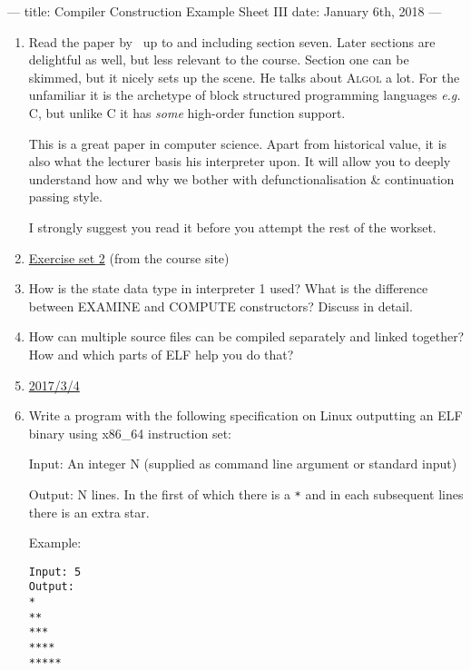 ---
title: Compiler Construction Example Sheet III
date: January 6th, 2018
---



\begin{enumerate}
  \item Read the paper by~\citet{reynolds1972definitional} up to and including
    section seven. Later sections are delightful as well, but less relevant to
    the course. Section one can be skimmed, but it nicely sets up the scene. He
    talks about \textsc{Algol} a lot. For the unfamiliar it is the archetype of
    block structured programming languages \emph{e.g.} \textsc{C}, but unlike
    \textsc{C} it has \emph{some} high-order function support.

    This is a great paper in computer science. Apart from historical value, it
    is also what the lecturer basis his interpreter upon. It will allow you to
    deeply understand how and why we bother with defunctionalisation \&
    continuation passing style.

    I strongly suggest you read it before you attempt the rest of the workset.

  \item
    \href{https://www.cl.cam.ac.uk/teaching/current/CompConstr/Exercises_Set_2.ml}{Exercise
    set 2} (from the course site)

  \item How is the state data type in interpreter 1 used? What is the
    difference between EXAMINE and COMPUTE constructors? Discuss in detail.

  \item How can multiple source files can be compiled separately and linked
    together? How and which parts of ELF help you do that?

  \item \href{http://www.cl.cam.ac.uk/teaching/exams/pastpapers/y2017p23q4.pdf}{2017/3/4}

  \item Write a program with the following specification on Linux outputting an
    ELF binary using x86\_64 instruction set:

    Input: An integer N (supplied as command line argument or standard input)

    Output: N lines. In the first of which there is a \texttt{*} and in each
    subsequent lines there is an extra star.

    Example:
    \begin{verbatim}
Input: 5
Output:
*
**
***
****
*****
    \end{verbatim}

\end{enumerate}


